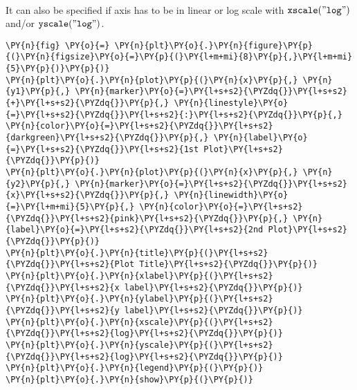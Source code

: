     \begin{center}
    \end{center}
    { \hspace*{\fill} \\}
    
    It can also be specified if axis has to be in linear or log scale with
\(\tt{xscale("log")}\) and/or \(\tt{yscale("log")}\).

    \begin{tcolorbox}[breakable, size=fbox, boxrule=1pt, pad at break*=1mm,colback=cellbackground, colframe=cellborder]
\begin{Verbatim}[commandchars=\\\{\}]
\PY{n}{fig} \PY{o}{=} \PY{n}{plt}\PY{o}{.}\PY{n}{figure}\PY{p}{(}\PY{n}{figsize}\PY{o}{=}\PY{p}{(}\PY{l+m+mi}{8}\PY{p}{,}\PY{l+m+mi}{5}\PY{p}{)}\PY{p}{)}
\PY{n}{plt}\PY{o}{.}\PY{n}{plot}\PY{p}{(}\PY{n}{x}\PY{p}{,} \PY{n}{y1}\PY{p}{,} \PY{n}{marker}\PY{o}{=}\PY{l+s+s2}{\PYZdq{}}\PY{l+s+s2}{+}\PY{l+s+s2}{\PYZdq{}}\PY{p}{,} \PY{n}{linestyle}\PY{o}{=}\PY{l+s+s2}{\PYZdq{}}\PY{l+s+s2}{:}\PY{l+s+s2}{\PYZdq{}}\PY{p}{,} \PY{n}{color}\PY{o}{=}\PY{l+s+s2}{\PYZdq{}}\PY{l+s+s2}{darkgreen}\PY{l+s+s2}{\PYZdq{}}\PY{p}{,} \PY{n}{label}\PY{o}{=}\PY{l+s+s2}{\PYZdq{}}\PY{l+s+s2}{1st Plot}\PY{l+s+s2}{\PYZdq{}}\PY{p}{)}
\PY{n}{plt}\PY{o}{.}\PY{n}{plot}\PY{p}{(}\PY{n}{x}\PY{p}{,} \PY{n}{y2}\PY{p}{,} \PY{n}{marker}\PY{o}{=}\PY{l+s+s2}{\PYZdq{}}\PY{l+s+s2}{x}\PY{l+s+s2}{\PYZdq{}}\PY{p}{,} \PY{n}{linewidth}\PY{o}{=}\PY{l+m+mi}{5}\PY{p}{,} \PY{n}{color}\PY{o}{=}\PY{l+s+s2}{\PYZdq{}}\PY{l+s+s2}{pink}\PY{l+s+s2}{\PYZdq{}}\PY{p}{,} \PY{n}{label}\PY{o}{=}\PY{l+s+s2}{\PYZdq{}}\PY{l+s+s2}{2nd Plot}\PY{l+s+s2}{\PYZdq{}}\PY{p}{)}
\PY{n}{plt}\PY{o}{.}\PY{n}{title}\PY{p}{(}\PY{l+s+s2}{\PYZdq{}}\PY{l+s+s2}{Plot Title}\PY{l+s+s2}{\PYZdq{}}\PY{p}{)}
\PY{n}{plt}\PY{o}{.}\PY{n}{xlabel}\PY{p}{(}\PY{l+s+s2}{\PYZdq{}}\PY{l+s+s2}{x label}\PY{l+s+s2}{\PYZdq{}}\PY{p}{)}
\PY{n}{plt}\PY{o}{.}\PY{n}{ylabel}\PY{p}{(}\PY{l+s+s2}{\PYZdq{}}\PY{l+s+s2}{y label}\PY{l+s+s2}{\PYZdq{}}\PY{p}{)}
\PY{n}{plt}\PY{o}{.}\PY{n}{xscale}\PY{p}{(}\PY{l+s+s2}{\PYZdq{}}\PY{l+s+s2}{log}\PY{l+s+s2}{\PYZdq{}}\PY{p}{)}
\PY{n}{plt}\PY{o}{.}\PY{n}{yscale}\PY{p}{(}\PY{l+s+s2}{\PYZdq{}}\PY{l+s+s2}{log}\PY{l+s+s2}{\PYZdq{}}\PY{p}{)}
\PY{n}{plt}\PY{o}{.}\PY{n}{legend}\PY{p}{(}\PY{p}{)}
\PY{n}{plt}\PY{o}{.}\PY{n}{show}\PY{p}{(}\PY{p}{)}
\end{Verbatim}
\end{tcolorbox}

